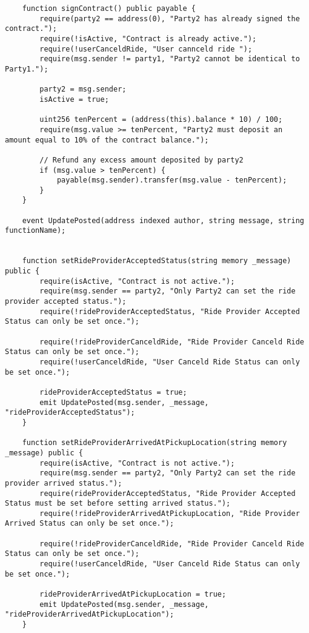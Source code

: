 \begin{lstlisting}
    function signContract() public payable {
        require(party2 == address(0), "Party2 has already signed the contract.");
        require(!isActive, "Contract is already active.");
        require(!userCanceldRide, "User cannceld ride ");
        require(msg.sender != party1, "Party2 cannot be identical to Party1.");
        
        party2 = msg.sender;
        isActive = true;

        uint256 tenPercent = (address(this).balance * 10) / 100;
        require(msg.value >= tenPercent, "Party2 must deposit an amount equal to 10% of the contract balance.");

        // Refund any excess amount deposited by party2
        if (msg.value > tenPercent) {
            payable(msg.sender).transfer(msg.value - tenPercent);
        }
    }

    event UpdatePosted(address indexed author, string message, string functionName);


    function setRideProviderAcceptedStatus(string memory _message) public {
        require(isActive, "Contract is not active.");
        require(msg.sender == party2, "Only Party2 can set the ride provider accepted status.");
        require(!rideProviderAcceptedStatus, "Ride Provider Accepted Status can only be set once.");

        require(!rideProviderCanceldRide, "Ride Provider Canceld Ride Status can only be set once.");
        require(!userCanceldRide, "User Canceld Ride Status can only be set once.");

        rideProviderAcceptedStatus = true;
        emit UpdatePosted(msg.sender, _message, "rideProviderAcceptedStatus");
    }

    function setRideProviderArrivedAtPickupLocation(string memory _message) public {
        require(isActive, "Contract is not active.");
        require(msg.sender == party2, "Only Party2 can set the ride provider arrived status.");
        require(rideProviderAcceptedStatus, "Ride Provider Accepted Status must be set before setting arrived status.");
        require(!rideProviderArrivedAtPickupLocation, "Ride Provider Arrived Status can only be set once.");

        require(!rideProviderCanceldRide, "Ride Provider Canceld Ride Status can only be set once.");
        require(!userCanceldRide, "User Canceld Ride Status can only be set once.");
        
        rideProviderArrivedAtPickupLocation = true;
        emit UpdatePosted(msg.sender, _message, "rideProviderArrivedAtPickupLocation");
    }


\end{lstlisting}
